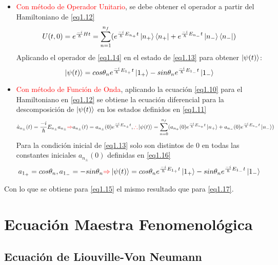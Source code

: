\documentclass{book}
\begin{document}
\begin{itemize}
    \item \textcolor{red}{Con método de Operador Unitario}, se debe obtener el operador a partir del Hamiltoniano de \ref{eq1.12}
\begin{equation}\label{eq1.14}U(t,0)=e^{\frac{-i}{\hslash}Ht}=\sum_{n=1}^{n_f}(e^{\frac{-i}{\hslash}E_{n_+}t}\ket{n_+}\bra{n_+}+e^{\frac{-i}{\hslash}E_{n_-}t}\ket{n_-}\bra{n_-})\end{equation}
Aplicando el operador de \ref{eq1.14} en el estado de \ref{eq1.13} para obtener $\ket{\psi(t)}$:
\begin{equation}\label{eq1.15}\ket{\psi(t)}=cos\theta_n e^{\frac{-i}{\hslash} E_{1_+}t}\ket{1_+}-sin\theta_n e^{\frac{-i}{\hslash} E_{1_-}t}\ket{1_-}\end{equation}
    \item \textcolor{red}{Con método de Función de Onda}, aplicando la ecuación \ref{eq1.10} para el Hamiltoniano en \ref{eq1.12} se obtiene la ecuación diferencial para la descomposición de $\ket{\psi(t)}$ en los estados definidos en \ref{eq1.11}
\begin{equation}\label{eq1.16}\dot{a}_{n_\pm}(t)=\frac{-i}{\hslash}E_{n_\pm}a_{n_\pm}\textcolor{red}{\Rightarrow} a_{n_\pm}(t)=a_{n_\pm}(0)e^{\frac{-i}{\hslash}E_{n_\pm}t}, \textcolor{red}{\therefore} \ket{\psi(t)}=\sum_{n=0}^{n_f} (a_{n_+}(0)e^{\frac{-i}{\hslash}E_{n_+}t}\ket{n_+}+a_{n_-}(0)e^{\frac{-i}{\hslash}E_{n_-}t}\ket{n_-})\end{equation}
Para la condición inicial de \ref{eq1.13} solo son distintos de 0 en todas las constantes iniciales $a_{n_\pm}(0)$ definidas en \ref{eq1.16} \begin{equation}\label{eq1.17} a_{1_+}=cos\theta_n, a_{1_-}=-sin\theta_n \textcolor{red}{\Rightarrow} \ket{\psi(t)}=cos\theta_n e^{\frac{-i}{\hslash}E_{1_+}t}\ket{1_+}-sin\theta_n e^{\frac{-i}{\hslash}E_{1_-}t}\ket{1_-}\end{equation}
\end{itemize}
Con lo que se obtiene para \ref{eq1.15} el mismo resultado que para \ref{eq1.17}.
\chapter{Ecuación Maestra Fenomenológica}

\section{Ecuación de Liouville-Von Neumann}
\end{document}
